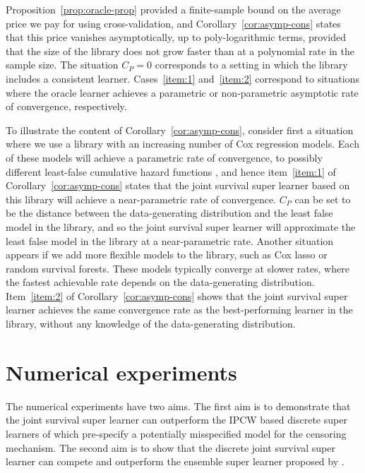 \documentclass[a4paper,danish]{article}
\newcommand{\1}{\mathds{1}}
\theoremstyle{plain} %
\numberwithin{theorem}{section}
\theoremstyle{definition} %
\theoremstyle{remark}
\begin{document}
Proposition~\ref{prop:oracle-prop} provided a finite-sample bound
on the average price we pay for using cross-validation, and
Corollary~\ref{cor:asymp-cons} states that this price vanishes
asymptotically, up to poly-logarithmic terms, provided that the size
of the library does not grow faster than at a polynomial rate in the
sample size. The situation \( C_P=0 \) corresponds to a setting in
which the library includes a consistent learner. Cases~\ref{item:1}
and~\ref{item:2} correspond to situations where the oracle learner
achieves a parametric or non-parametric asymptotic rate of
convergence, respectively.

To illustrate the content of Corollary~\ref{cor:asymp-cons}, consider
first a situation where we use a library with an increasing number of
Cox regression models. Each of these models will achieve a parametric
rate of convergence, to possibly different least-false cumulative
hazard functions \cite{hjort1992inference}, and hence
item~\ref{item:1} of Corollary~\ref{cor:asymp-cons} states that the
joint survival super learner based on this library will achieve a
near-parametric rate of convergence.  \( C_P \) can be set to be the
distance between the data-generating distribution and the least false
model in the library, and so the joint survival super learner will
approximate the least false model in the library at a near-parametric
rate. Another situation appears if we add more flexible models to the
library, such as Cox lasso or random survival forests.  These models
typically converge at slower rates, where the fastest achievable rate
depends on the data-generating distribution.  Item~\ref{item:2} of
Corollary~\ref{cor:asymp-cons} shows that the joint survival super
learner achieves the same convergence rate as the best-performing
learner in the library, without any knowledge of the data-generating
distribution.

\section{Numerical experiments}
\label{sec:numer-exper}

The numerical experiments have two aims. The first aim is to
demonstrate that the joint survival super learner can outperform the
IPCW based discrete super learners of \citep{gonzalez2021stacked}
which pre-specify a potentially misspecified model for the censoring
mechanism. The second aim is to show that the discrete joint survival
super learner can compete and outperform the ensemble super learner
proposed by \cite{westling2021inference}.
\end{document}
